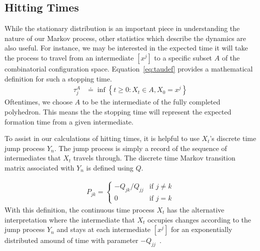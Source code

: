 

\subsection{Hitting Times}

While the stationary distribution is an important piece in understanding the nature of our Markov process, other statistics which describe the dynamics are also useful. For instance, we may be interested in the expected time it will take the process to travel from an intermediate $[x^j]$ to a specific subset $A$ of the combinatorial configuration space. Equation~\ref{eq:taudef} provides a mathematical definition for such a stopping time.
\begin{align}
  \label{eq:taudef}
	\tau^{A}_{j} &\doteq \inf\left\{t \geq 0 : X_t \in A, X_0 = x^j\right\}
\end{align}
Oftentimes, we choose $A$ to be the intermediate of the fully completed polyhedron. This means the the stopping time will represent the expected formation time from a given intermediate.
 
To assist in our calculations of hitting times, it is helpful to use $X_t$'s discrete time jump process $Y_n$. The jump process is simply a record of the sequence of intermediates that $X_t$ travels through. The discrete time Markov transition matrix associated with $Y_n$ is defined using $Q$.

\begin{align}
  \label{eq:Pdef}
  P_{jk} =
  \begin{cases}
   -Q_{jk}/Q_{jj} & \text{if } j \neq k  \\
   0  & \text{if } j = k 
  \end{cases}
\end{align}
With this definition, the continuous time process $X_t$ has the alternative interpretation where the intermediate that $X_t$ occupies changes according to the jump process $Y_n$ and stays at each intermediate $[x^j]$ for an exponentially distributed amound of time with parameter $-Q_{jj}$~\cite{Norris1998}. 
%
%

